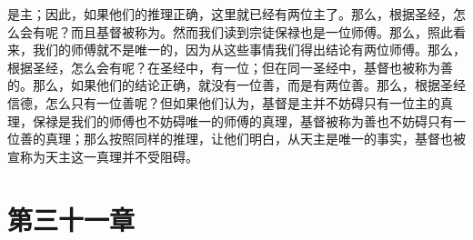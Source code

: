 是主；因此，如果他们的推理正确，这里就已经有两位主了。那么，根据圣经，怎么会有呢？而且基督被称为。然而我们读到宗徒保禄也是一位师傅。那么，照此看来，我们的师傅就不是唯一的，因为从这些事情我们得出结论有两位师傅。那么，根据圣经，怎么会有呢？在圣经中，有一位；但在同一圣经中，基督也被称为善的。那么，如果他们的结论正确，就没有一位善，而是有两位善。那么，根据圣经信德，怎么只有一位善呢？但如果他们认为，基督是主并不妨碍只有一位主的真理，保禄是我们的师傅也不妨碍唯一的师傅的真理，基督被称为善也不妨碍只有一位善的真理；那么按照同样的推理，让他们明白，从天主是唯一的事实，基督也被宣称为天主这一真理并不受阻碍。\par


\section{第三十一章}

\par

